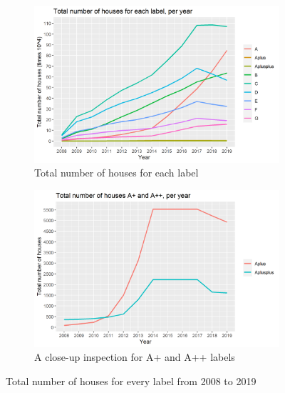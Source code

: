 \documentclass[a4paper,11pt]{article}
\begin{document}
\begin{figure}
\begin{subfigure}{0.5\textwidth}
\includegraphics[width=\linewidth]{Tot no. of houses for each label, per year.png} 
\caption{Total number of houses for each label}
\label{fig:subim1}
\end{subfigure}
\begin{subfigure}{0.5\textwidth}
\includegraphics[width = \linewidth]{A closeup view for A+ and A++.png}
\caption{A close-up inspection for A+ and A++ labels}
\label{fig:subim2}
\end{subfigure}

\caption{Total number of houses for every label from 2008 to 2019}
\label{fig:image2}
\end{figure}
\end{document}
